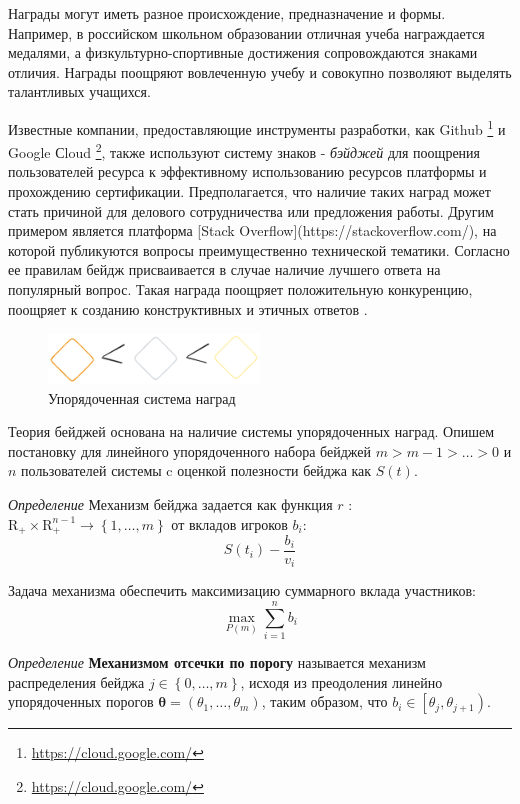 Награды могут иметь разное происхождение, предназначение и формы. 
Например, в российском школьном образовании отличная учеба награждается медалями, а физкультурно-спортивные достижения сопровождаются знаками отличия.
Награды поощряют вовлеченную учебу и совокупно позволяют выделять талантливых учащихся. 

Известные компании, предоставляющие инструменты разработки, как Github \footnote{\url{https://cloud.google.com/}}
и Google Сloud \footnote{\url{https://cloud.google.com/}}, также используют систему знаков - \textit{бэйджей} 
для поощрения пользователей ресурса к эффективному использованию ресурсов платформы и прохождению сертификации. 
Предполагается, что наличие таких наград может стать причиной для делового сотрудничества или предложения работы. Другим примером является платформа [Stack Overflow](https://stackoverflow.com/),
на которой публикуются вопросы преимущественно технической тематики.
Согласно ее правилам бейдж присваивается в случае наличие лучшего ответа на популярный вопрос.
Такая награда поощряет положительную конкуренцию, поощряет к созданию конструктивных и этичных ответов \cite{yanovsky2021one}.
\begin{figure}[h]
    \centering
    \includegraphics[width=0.5\textwidth]{assets/pedagogic/social/badge.excalidraw.png}
    \caption{Упорядоченная система наград}
    \label{badge}
\end{figure}


Теория бейджей основана на наличие системы упорядоченных наград. Опишем постановку для линейного
упорядоченного набора бейджей $m > m-1 > \dots > 0$ и $n$ пользователей системы c оценкой полезности бейджа
как $S(t)$. 

\textit{Определение} Механизм бейджа задается как функция $r$ : $\mathrm{R}_{+} \times \mathrm{R}_{+}^{n-1} \rightarrow \left\{1, \dots,m \right\}$ 
от вкладов игроков $b_i$:
\begin{equation}
    S(t_i) - \frac{b_i}{v_i}
\end{equation}

Задача механизма обеспечить максимизацию суммарного вклада участников:
\begin{equation}
    \max_{P(m)} \sum_{i=1}^n b_i
\end{equation}

\textit{Определение} \textbf{Механизмом отсечки по порогу} называется механизм распределения
бейджа $j \in \left\{0,\dots,m\right\}$, исходя из преодоления линейно упорядоченных порогов
$\mathbf{\theta} =(\theta_1,\dots,\theta_m)$, таким образом, что $b_i \in \left[\theta_j,\theta_{j+1}\right)$.

